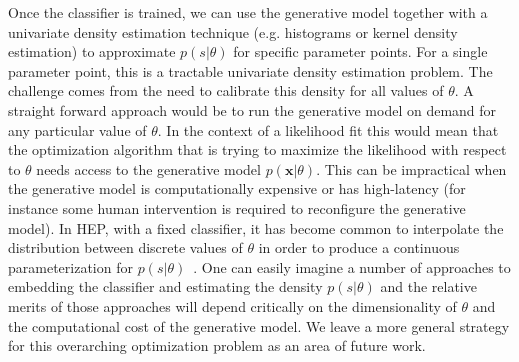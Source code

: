 \documentclass[12pt]{article}
\numberwithin{equation}{section}
\theoremstyle{plain}
\begin{document}
Once the classifier is trained, we can use the generative model together with a
univariate density estimation technique (e.g. histograms or kernel density
estimation) to approximate $p(s|\theta)$ for specific parameter
points. For a single parameter point, this is a tractable univariate density
estimation problem. The challenge comes from the need to calibrate this density
for all values of $\theta$. A straight forward approach would be to run the
generative model on demand for any particular value of $\theta$. In the context
of a likelihood fit this would mean that the optimization algorithm that is
trying to maximize the likelihood with respect to $\theta$ needs access to the
generative model $p(\mathbf{x}|\theta)$. This can be  impractical when the generative
model is computationally expensive or has high-latency (for instance some human
intervention is required to reconfigure the generative model).  In HEP, with a
fixed classifier, it has become common  to interpolate the distribution between
discrete values of $\theta$ in order to produce a continuous parameterization for
$p(s | \theta)$~\citep{Cranmer:2012sba}.
One can easily imagine a number of approaches to embedding the classifier and
estimating the density $p(s|\theta)$ and the relative merits of those
approaches will depend critically on the dimensionality of $\theta$ and the
computational cost of the generative model. We leave a more general strategy for
this overarching optimization problem as an area of future work.




\end{document}
